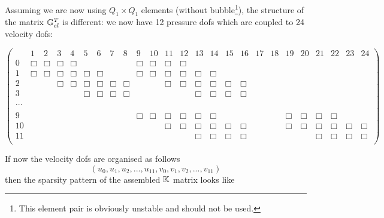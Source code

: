 Assuming we are now using $Q_1\times Q_1$ elements (without bubble\footnote{This element
pair is obviously unstable and should not be used.}), 
the structure of the matrix ${\mathbb{G}}_{el}^T$ is different: we now have 12 pressure dofs 
which are coupled to 24 velocity dofs:
\begin{scriptsize}
\begin{equation}
\left(
\begin{array}{ccccccccccccccccccccccccc}
 & 1 & 2 & 3 & 4 & 5 & 6 & 7 & 8 & 9 & 10 & 11 & 12 & 13 & 14 & 15 & 16 & 17 & 18 & 19 & 20 & 21 & 22 & 23 & 24    \\
0 &\Box&\Box & \Box&\Box &  &  &  &  & \Box&\Box & \Box&\Box &  &  &  &  &  &  &  &  &  &  &  &  \\
1 & \Box&\Box & \Box&\Box & \Box  & \Box  &  &  & \Box&\Box & \Box&\Box & \Box  & \Box  &  &  &  &  &  &  &  &  &  & \\
2 &  & & \Box&\Box & \Box  & \Box  & \Box  & \Box  & & & \Box&\Box & \Box  & \Box  & \Box  &\Box  &  &  &  &  &  &  &  & \\ 
3 &  & & &  & \Box  & \Box  & \Box  & \Box  & & & & & \Box  & \Box  & \Box  &\Box  &  &  &  &  &  &  &  & \\ 
\\
... \\
\\
9 & & & & & & & & &\Box &\Box &\Box &\Box & \Box  & \Box &  &  & & &\Box &\Box & \Box &\Box & &  \\
10 & & & & & & & & & & &\Box &\Box & \Box  & \Box & \Box & \Box & & &\Box &\Box & \Box &\Box &\Box & \Box \\
11 & & & & & & & & & & & & & \Box  & \Box & \Box & \Box & & & & & \Box &\Box &\Box & \Box \\
\end{array}
\right)
\end{equation} 
\end{scriptsize}

If now the velocity dofs are organised as follows 
\[
(u_0,u_1,u_2,...,u_{11},v_0,v_1,v_2,...,v_{11})
\]
then the sparsity pattern of the assembled ${\mathbb{K}}$ matrix looks like 



